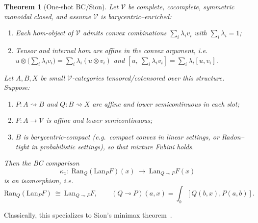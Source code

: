 \documentclass[11pt]{article}
\numberwithin{equation}{section}
\theoremstyle{upright}
\newtheorem{theorem}{Theorem}
\newcommand{\V}{\mathcal{V}}
\newcommand{\Lan}{\mathrm{Lan}}
\newcommand{\Ran}{\mathrm{Ran}}
\newcommand{\profto}{\rightsquigarrow}
\newcommand{\resid}{\multimap}
\begin{document}
\begin{theorem}[One-shot BC/Sion]\label{thm:one-shot-BC}
Let $\V$ be complete, cocomplete, symmetric monoidal closed, and assume $\V$ is
\emph{barycentric--enriched}:
\begin{enumerate}[label=(\roman*), itemsep=0.25ex]
\item Each hom-object of $\V$ admits convex combinations $\sum_i \lambda_i v_i$ with $\sum_i\lambda_i=1$;
\item Tensor and internal hom are affine in the convex argument, i.e.\
$u\otimes\big(\sum_i\lambda_i v_i\big)=\sum_i\lambda_i(u\otimes v_i)$
and
$[u,\ \sum_i\lambda_i v_i]=\sum_i\lambda_i [u,v_i]$.
\end{enumerate}
Let $A,B,X$ be small $\V$-categories tensored/cotensored over this structure.
Suppose:
\begin{enumerate}[label=(\alph*), itemsep=0.25ex]
\item $P:A\profto B$ and $Q:B\profto X$ are affine and lower semicontinuous in each slot;
\item $F:A\to\V$ is affine and lower semicontinuous;
\item $B$ is barycentric-compact (e.g.\ compact convex in linear settings, or Radon--tight in probabilistic settings), so that mixture Fubini holds.
\end{enumerate}
Then the BC comparison
\[
\kappa_x:\ \Ran_Q(\Lan_P F)(x)\ \longrightarrow\ \Lan_{Q\resid P}F(x)
\]
is an isomorphism, i.e.
\[
\Ran_Q(\Lan_P F)\ \cong\ \Lan_{Q\resid P}F,
\qquad
(Q\resid P)(a,x)=\int_b [Q(b,x),P(a,b)].
\]
\end{theorem}
Classically, this specializes to Sion’s minimax theorem~\citep{Sion1958}.
\end{document}

